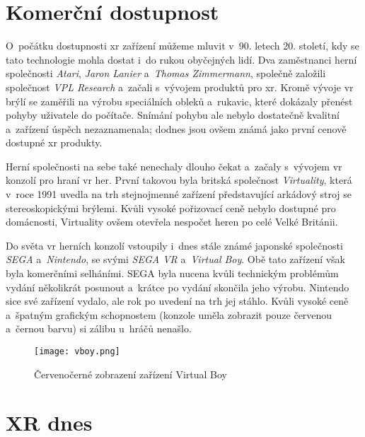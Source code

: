 \section{Komerční dostupnost}

O~počátku dostupnosti \gls{xr} zařízení můžeme mluvit v~90. letech 20. století, kdy se tato technologie mohla dostat i~do rukou obyčejných lidí. Dva zaměstnanci herní společnosti \textit{Atari}, \textit{Jaron Lanier} a~\textit{Thomas Zimmermann}, společně založili společnost \textit{VPL Research} a~začali s~vývojem produktů pro \gls{xr}. Kromě vývoje \gls{vr} brýlí se zaměřili na výrobu speciálních obleků a~rukavic, které dokázaly přenést pohyby uživatele do počítače. Snímání pohybu ale nebylo dostatečně kvalitní a~zařízení úspěch nezaznamenala; dodnes jsou ovšem známá jako první cenově dostupné \gls{xr} produkty. \cite{otechnice_2}

Herní společnosti na sebe také nenechaly dlouho čekat a~začaly s~vývojem \gls{vr} konzolí pro hraní \gls{vr} her. První takovou byla britská společnost \textit{Virtuality}, která v~roce 1991 uvedla na trh stejnojmenné zařízení představující arkádový stroj se stereoskopickými brýlemi. Kvůli vysoké pořizovací ceně nebylo dostupné pro domácnosti, Virtuality ovšem otevřela nespočet heren po celé Velké Británii. \cite{otechnice_2} \cite{independent_virtuality}

Do světa \gls{vr} herních konzolí vstoupily i~dnes stále známé japonské společnosti \textit{SEGA} a~\textit{Nintendo}, se svými \textit{SEGA VR} a~\textit{Virtual Boy}. Obě tato zařízení však byla komerčními selháními. SEGA byla nucena kvůli technickým problémům vydání několikrát posunout a~krátce po vydání skončila jeho výrobu. Nintendo sice své zařízení vydalo, ale rok po uvedení na trh jej stáhlo. Kvůli vysoké ceně a~špatným grafickým schopnostem (konzole uměla zobrazit pouze červenou a~černou barvu) si zálibu u~hráčů nenašlo.\cite{otechnice_2}

\begin{figure}[H]
    \centering
    \texttt{[image: vboy.png]}
    \caption{Červeno\textendash černé zobrazení zařízení Virtual Boy \cite{vboy}}
    \label{vboy_red_display}
\end{figure}

\section{XR dnes}

